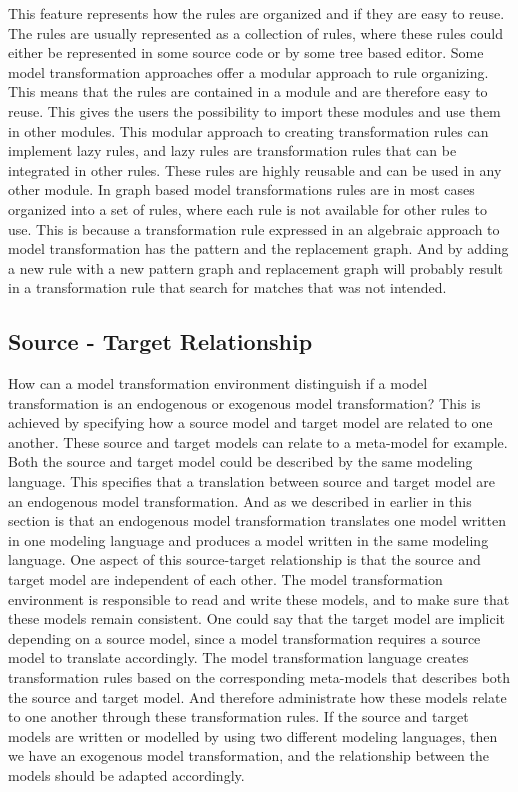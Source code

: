 This feature represents how the rules are organized and if they are easy to
reuse. The rules are usually represented as a collection of rules, where these
rules could either be represented in some source code or by some tree based
editor. Some model transformation approaches offer a modular approach to rule
organizing. This means that the rules are contained in a module and are
therefore easy to reuse. This gives the users the possibility to import these
modules and use them in other modules. This modular approach to creating
transformation rules can implement lazy rules, and lazy rules are transformation
rules that can be integrated in other rules. These rules are highly reusable and
can be used in any other module. In graph based model transformations rules are
in most cases organized into a set of rules, where each rule is not available
for other rules to use. This is because a transformation rule expressed in an
algebraic approach to model transformation has the pattern and the replacement
graph. And by adding a new rule with a new pattern graph and replacement graph
will probably result in a transformation rule that search for matches that was
not intended. 

\subsection{Source - Target Relationship}

How can a model transformation environment distinguish if a model
transformation is an endogenous or exogenous model transformation? This is
achieved by specifying how a source model and target model are related to one
another. These source and target models can relate to a meta-model for example.
Both the source and target model could be described by the same modeling
language. This specifies that a translation between source and target model are
an endogenous model transformation. And as we described in earlier in this
section is that an endogenous model transformation translates one model written
in one modeling language and produces a model written in the same modeling
language. One aspect of this source-target relationship is that the source and
target model are independent of each other. The model transformation
environment is responsible to read and write these models, and to make sure that
these models remain consistent. One could say that the target model are
implicit depending on a source model, since a model transformation requires a
source model to translate accordingly. The model transformation language creates
transformation rules based on the corresponding meta-models that describes both
the source and target model. And therefore administrate how these models relate
to one another through these transformation rules. If the source and target
models are written or modelled by using two different modeling languages, then
we have an exogenous model transformation, and the relationship between the
models should be adapted accordingly.

